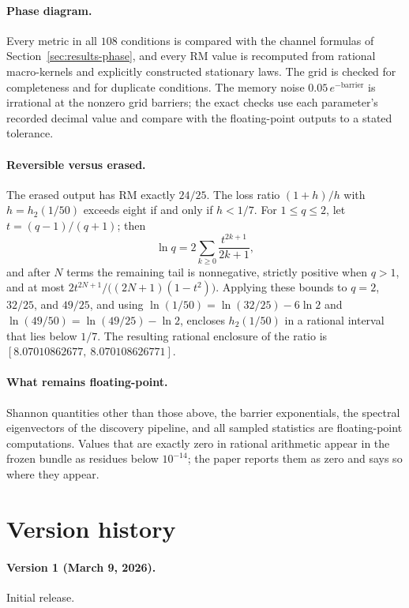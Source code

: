 \paragraph{Phase diagram.} Every metric in all \(108\) conditions is compared with the channel formulas of Section~\ref{sec:results-phase}, and every RM value is recomputed from rational macro-kernels and explicitly constructed stationary laws. The grid is checked for completeness and for duplicate conditions. The memory noise \(0.05\,e^{-\mathrm{barrier}}\) is irrational at the nonzero grid barriers; the exact checks use each parameter's recorded decimal value and compare with the floating-point outputs to a stated tolerance.

\paragraph{Reversible versus erased.} The erased output has RM exactly \(24/25\). The loss ratio \((1+h)/h\) with \(h=h_2(1/50)\) exceeds eight if and only if \(h<1/7\). For \(1\le q\le2\), let \(t=(q-1)/(q+1)\); then
\[
\ln q=2\sum_{k\ge0}\frac{t^{2k+1}}{2k+1},
\]
and after \(N\) terms the remaining tail is nonnegative, strictly positive when \(q>1\), and at most \(2t^{2N+1}/\bigl((2N+1)(1-t^2)\bigr)\). Applying these bounds to \(q=2\), \(32/25\), and \(49/25\), and using \(\ln(1/50)=\ln(32/25)-6\ln 2\) and \(\ln(49/50)=\ln(49/25)-\ln 2\), encloses \(h_2(1/50)\) in a rational interval that lies below \(1/7\). The resulting rational enclosure of the ratio is \([8.07010862677,\ 8.070108626771]\).

\paragraph{What remains floating-point.} Shannon quantities other than those above, the barrier exponentials, the spectral eigenvectors of the discovery pipeline, and all sampled statistics are floating-point computations. Values that are exactly zero in rational arithmetic appear in the frozen bundle as residues below \(10^{-14}\); the paper reports them as zero and says so where they appear.

\section{Version history}
\label{sec:appendix-versions}

\paragraph{Version 1 (March 9, 2026).} Initial release.

